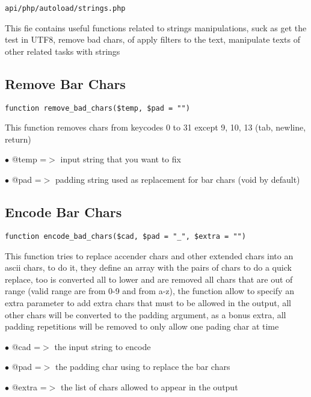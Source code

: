 \documentclass[a4paper]{book}
\begin{document}
\begin{lstlisting}
api/php/autoload/strings.php
\end{lstlisting}

This fie contains useful functions related to strings manipulations, suck as get the test in
UTF8, remove bad chars, of apply filters to the text, manipulate texts of other related tasks
with strings

\hypertarget{toc266}{}
\subsection{Remove Bar Chars}

\begin{lstlisting}
function remove_bad_chars($temp, $pad = "")
\end{lstlisting}

This function removes chars from keycodes 0 to 31 except 9, 10, 13 (tab,
newline, return)

\begin{compactitem}
\item[\color{myblue}$\bullet$] @temp =$>$ input string that you want to fix
\item[\color{myblue}$\bullet$] @pad  =$>$ padding string used as replacement for bar chars (void by default)
\end{compactitem}

\hypertarget{toc267}{}
\subsection{Encode Bar Chars}

\begin{lstlisting}
function encode_bad_chars($cad, $pad = "_", $extra = "")
\end{lstlisting}

This function tries to replace accender chars and other extended chars into
an ascii chars, to do it, they define an array with the pairs of chars to
do a quick replace, too is converted all to lower and are removed all chars
that are out of range (valid range are from 0-9 and from a-z), the function
allow to specify an extra parameter to add extra chars that must to be
allowed in the output, all other chars will be converted to the padding
argument, as a bonus extra, all padding repetitions will be removed to
only allow one pading char at time

\begin{compactitem}
\item[\color{myblue}$\bullet$] @cad   =$>$ the input string to encode
\item[\color{myblue}$\bullet$] @pad   =$>$ the padding char using to replace the bar chars
\item[\color{myblue}$\bullet$] @extra =$>$ the list of chars allowed to appear in the output
\end{compactitem}
\end{document}
